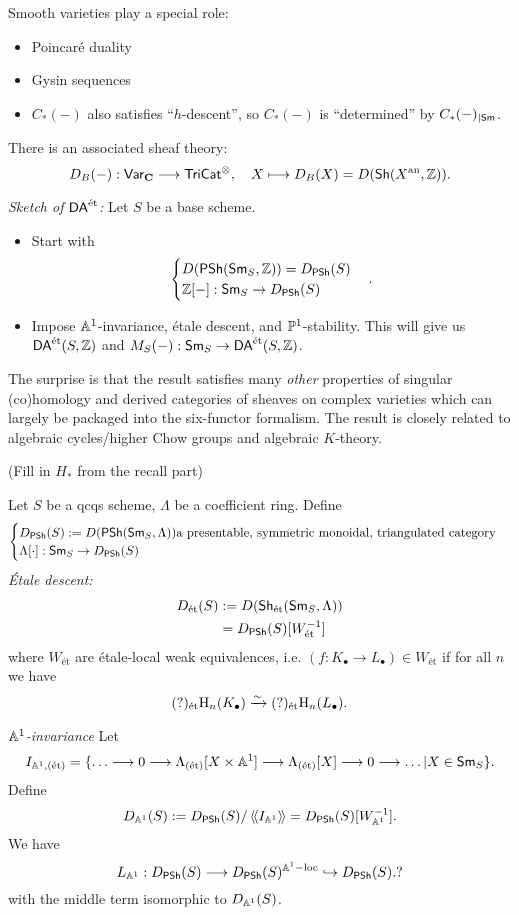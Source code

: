 Smooth varieties play a special role:
\begin{itemize}
\item Poincar\'e duality
\item Gysin sequences
\item $C_*(-)$ also satisfies ``$h$-descent'', so $C_*(-)$ is ``determined'' by $C_*(-)_{|\Sm}$.
\end{itemize}
There is an associated sheaf theory:
\[
D_B(-):\cat{Var}_{\bb{C}}\to \cat{TriCat}^{\otimes},\quad X\mapsto D_B(X) = D(\Sh(X\an,\Z))
.\]

\emph{Sketch of $\DAet$:} Let $S$ be a base scheme.
\begin{itemize}
\item Start with
\[
\begin{cases}
D(\PSh(\Sm_S, \Z)) = D_{\PSh}(S) \\
\Z[-]: \Sm_S \to D_{\PSh}(S)
\end{cases}
.\]
\item Impose $\Aff^{1}$-invariance, \'etale descent, and $\P^{1}$-stability. This will
give us $\DAet(S,\Z)$ and $M_S(-):\Sm_S\to \DAet(S,\Z)$.
\end{itemize}
The surprise is that the result satisfies many \emph{other} properties of singular
(co)homology and derived categories of sheaves on complex varieties which can largely be
packaged into the six-functor formalism. The result is closely related to algebraic
cycles/higher Chow groups and algebraic $K$-theory.

(Fill in $H_*$ from the recall part)

Let $S$ be a qcqs scheme, $\Lambda$ be a coefficient ring. Define
\[
\begin{cases}
D_{\PSh}(S) \defeq D(\PSh(\Sm_S,\Lambda)) \text{a presentable, symmetric monoidal,
triangulated category}\\
\Lambda[\cdot ]:\Sm_S \to D_{\PSh}(S)
\end{cases}
\]
\emph{\'Etale descent:}
\begin{align*}
D_{\text{\'et}}(S) &\defeq D(\Sh_{\text{\'et}}(\Sm_S,\Lambda)) \\
&= D_{\PSh}(S)[W_{\text{\'et}}^{-1}]
\end{align*}
where $W_{\text{\'et}}$ are \'etale-local weak equivalences, i.e. $(f:K_\bullet\to
L_\bullet)\in W_{\text{\'et}}$ if for all $n$ we have
\[
(?)_{\text{\'et}}\CH_n(K_\bullet) \simto (?)_{\text{\'et}}\CH_n(L_\bullet).
\]

\emph{$\Aff^{1}$-invariance}
Let
\[
I_{\Aff^{1},(\text{\'et})} = \{\dots\to 0\to \Lambda_{(\text{\'et})}[X\times \Aff^{1}]\to
\Lambda_{(\text{\'et})}[X]\to 0\to \dots | X\in \Sm_S\} .
\]
Define
\[
D_{\Aff^{1}}(S) \defeq D_{\PSh}(S) / \gen{I_{\Aff^{1}}} = D_{\PSh}(S)[W_{\Aff^{1}}^{-1}].
\]
We have
\[
L_{\Aff^{1}}: D_{\PSh}(S) \to D_{\PSh}(S)^{\Aff^{1}-\text{loc}} \injto D_{\PSh}(S).?
\]
with the middle term isomorphic to $D_{\Aff^{1}}(S)$.


